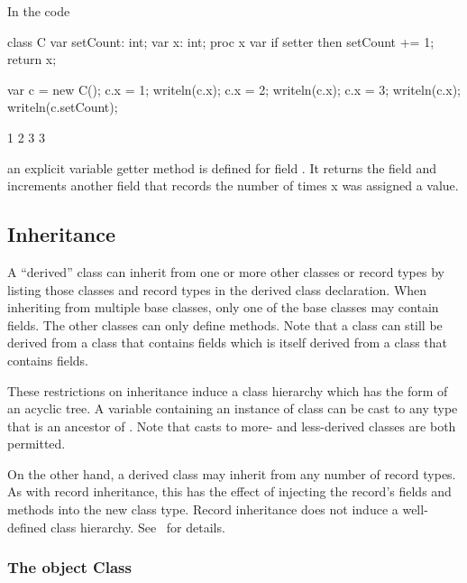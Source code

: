 \begin{example}
In the code
\begin{chapelpre}
\end{chapelpre}
\begin{chapel}
class C {
  var setCount: int;
  var x: int;
  proc x var {
    if setter then
      setCount += 1;
    return x;
  }
}
\end{chapel}
\begin{chapelpost}
var c = new C();
c.x = 1;
writeln(c.x);
c.x = 2;
writeln(c.x);
c.x = 3;
writeln(c.x);
writeln(c.setCount);
\end{chapelpost}
\begin{chapeloutput}
1
2
3
3
\end{chapeloutput}
an explicit variable getter method is defined for field .  It
returns the field  and increments another field that records
the number of times x was assigned a value.
\end{example}

\subsection{Inheritance}
\label{Inheritance}

A ``derived'' class can inherit from one or more other classes or record types by
listing those classes and record types in the derived class declaration.
When inheriting from multiple base classes, only one of the base classes
may contain fields.  The other classes can only define methods.  Note
that a class can still be derived from a class that contains fields
which is itself derived from a class that contains fields.  

These restrictions on inheritance induce a class hierarchy which has the form of
an acyclic tree.  A variable containing an instance of class  can be
cast to any type that is an ancestor of .  Note that casts to more- and
less-derived classes are both permitted.

On the other hand, a derived class may inherit from any number of record types.
As with record inheritance, this has the effect of injecting the record's fields and
methods into the new class type.  Record inheritance does not induce a
well-defined class hierarchy.  See~ for details.

\subsubsection{The object Class}
\label{The_object_Class}

